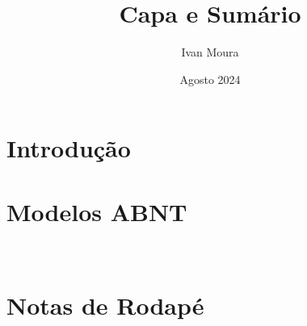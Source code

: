 \documentclass[12pt]{article}
\begin{document}
\SetWatermarkText{}

\title{Capa e Sumário}%
\author{Ivan Moura}%
\date{Agosto 2024}%
\maketitle %
\thispagestyle{empty} %
\newpage

\setcounter{page}{1} %
\tableofcontents %
\newpage

\listoffigures %
\newpage

\setcounter{page}{1} %

\section{Introdução}


\section{Modelos ABNT}
\\
\lipsum[1-3]

\section{Notas de Rodapé}

\lipsum[2]
\end{document}
